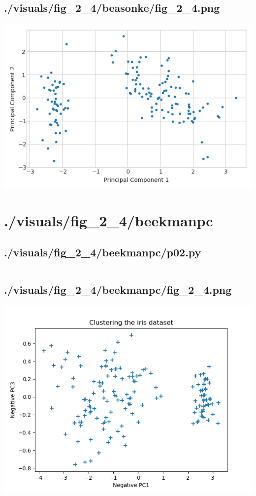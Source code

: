 \documentclass{report}
\begin{document}
    \subsection{./visuals/fig\_2\_4/beasonke/fig\_2\_4.png}
    \includegraphics[width=\textwidth]{.././visuals/fig_2_4/beasonke/fig_2_4.png}
    \pagebreak
    \section{./visuals/fig\_2\_4/beekmanpc}
    \subsection{./visuals/fig\_2\_4/beekmanpc/p02.py}
    \inputminted[breaklines=true]{python}{.././visuals/fig_2_4/beekmanpc/p02.py}
    \subsection{./visuals/fig\_2\_4/beekmanpc/fig\_2\_4.png}
    \includegraphics[width=\textwidth]{.././visuals/fig_2_4/beekmanpc/fig_2_4.png}
    \pagebreak
\end{document}
